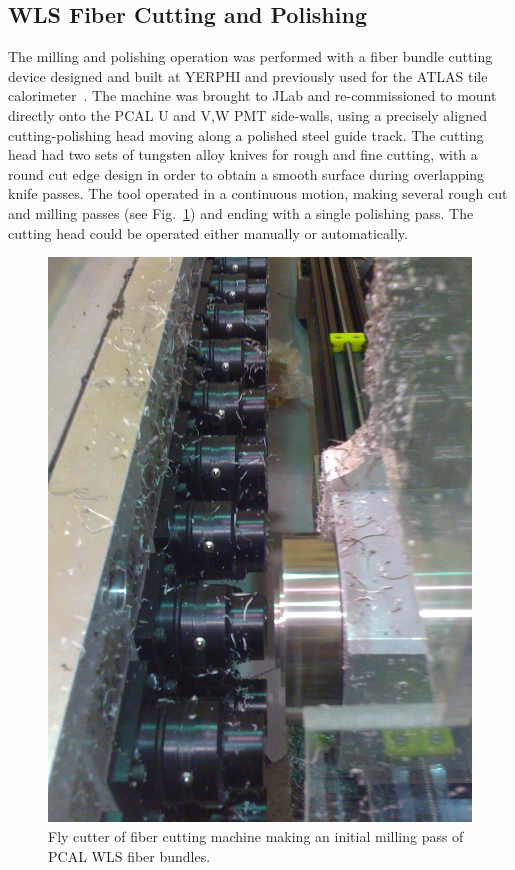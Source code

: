 \subsection{WLS Fiber Cutting and Polishing}
\label{WLS cutting}

The milling and polishing operation was performed with a fiber bundle cutting device designed and built at YERPHI
and previously used for the ATLAS tile calorimeter~\cite{ATLAS1997}.  The machine was brought to JLab and
re-commissioned to mount directly onto the PCAL U and V,W PMT side-walls, using a precisely aligned cutting-polishing
head moving along a polished steel guide track.  The cutting head had two sets of tungsten alloy knives for rough and
fine cutting, with a round cut edge design in order to obtain a smooth surface during overlapping knife passes. The
tool operated in a continuous motion, making several rough cut and milling passes (see Fig.~\ref{fig:S3_5d}) and
ending with a single polishing pass.  The cutting head could be operated either manually or automatically. 

\begin{figure}[hbt]
\centering
\includegraphics[width=0.95\columnwidth,keepaspectratio]{img/S3_5d.png}
\caption[Cutter 2]{Fly cutter of fiber cutting machine making an initial milling pass of PCAL WLS fiber bundles.}
\label{fig:S3_5d}
\end{figure}

